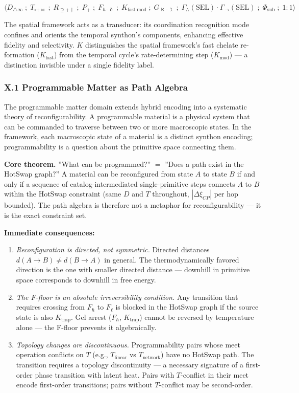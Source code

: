 \documentclass[12pt,a4paper]{article}
\begin{document}
\[\langle D_{\bigtriangleup\infty} \;;\; T_{\square+\bowtie} \;;\; R_{\supseteq+\ddagger} \;;\; P_{+} \;;\; F_{\hbar\cdot\eth} \;;\; K_{\text{fast}\cdot\text{mod}} \;;\; G_{\aleph\cdot\gimel} \;;\; \Gamma_{\wedge}(\text{SEL})\cdot\Gamma_{\to}(\text{SEL}) \;;\; \Phi_{\text{sub}} \;;\; 1:1 \rangle\]

The spatial framework acts as a transducer: its coordination recognition mode confines and orients the temporal synthon's components, enhancing effective fidelity and selectivity. $K$ distinguishes the spatial framework's fast chelate re-formation ($K_{\text{fast}}$) from the temporal cycle's rate-determining step ($K_{\text{mod}}$) --- a distinction invisible under a single fidelity label.

\subsubsection{X.1 Programmable Matter as Path Algebra}

The programmable matter domain extends hybrid encoding into a systematic theory of reconfigurability. A programmable material is a physical system that can be commanded to traverse between two or more macroscopic states. In the framework, each macroscopic state of a material is a distinct synthon encoding; programmability is a question about the primitive space connecting them.

\textbf{Core theorem.} ''What can be programmed?'' $=$ ''Does a path exist in the HotSwap graph?'' A material can be reconfigured from state $A$ to state $B$ if and only if a sequence of catalog-intermediated single-primitive steps connects $A$ to $B$ within the HotSwap constraint (same $D$ and $T$ throughout, $|\Delta\xi_{CP}|$ per hop bounded). The path algebra is therefore not a metaphor for reconfigurability --- it is the exact constraint set.

\textbf{Immediate consequences:}

\begin{enumerate}
    \item \emph{Reconfiguration is directed, not symmetric.} Directed distances $d(A \to B) \neq d(B \to A)$ in general. The thermodynamically favored direction is the one with smaller directed distance --- downhill in primitive space corresponds to downhill in free energy.
    \item \emph{The F-floor is an absolute irreversibility condition.} Any transition that requires crossing from $F_\hbar$ to $F_\ell$ is blocked in the HotSwap graph if the source state is also $K_\text{trap}$. Gel arrest ($F_\hbar$, $K_\text{trap}$) cannot be reversed by temperature alone --- the F-floor prevents it algebraically.
    \item \emph{Topology changes are discontinuous.} Programmability pairs whose meet operation conflicts on $T$ (e.g., $T_\text{linear}$ vs $T_\text{network}$) have no HotSwap path. The transition requires a topology discontinuity --- a necessary signature of a first-order phase transition with latent heat. Pairs with $T$-conflict in their meet encode first-order transitions; pairs without $T$-conflict may be second-order.
\end{enumerate}
\end{document}
